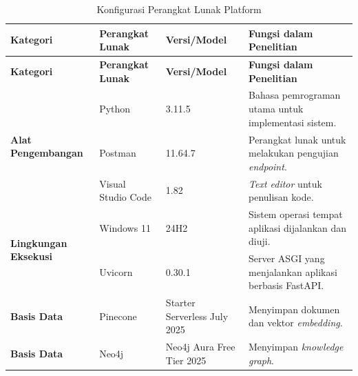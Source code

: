 \begin{longtable}{
	@{}p{2.5cm}
	p{2.5cm}
	p{3cm}
	p{\textwidth - 2.5cm - 2.5cm - 3cm - 6\tabcolsep}@{}}


	\caption{Konfigurasi Perangkat Lunak Platform}
	\label{tab:konfigurasi}                                                                                                                                                                 \\

	\toprule
	\textbf{Kategori}                              & \textbf{Perangkat Lunak} & \textbf{Versi/Model}         & \textbf{Fungsi dalam Penelitian}                                             \\
	\midrule
	\endfirsthead

	\toprule
	\textbf{Kategori}                              & \textbf{Perangkat Lunak} & \textbf{Versi/Model}         & \textbf{Fungsi dalam Penelitian}                                             \\
	\midrule
	\endhead


	\multirow{3}{=}{\textbf{Alat Pengembangan}}    & Python                   & 3.11.5                       & Bahasa pemrograman utama untuk implementasi sistem.                          \\
	                                               & Postman                  & 11.64.7                      & Perangkat lunak untuk melakukan pengujian \textit{endpoint}.                 \\
	                                               & Visual Studio Code       & 1.82                         & \textit{Text editor} untuk penulisan kode.                                   \\ \midrule

	\multirow{2}{=}{\textbf{Lingkungan Eksekusi}}  & Windows 11               & 24H2                         & Sistem operasi tempat aplikasi dijalankan dan diuji.                         \\
	                                               & Uvicorn                  & 0.30.1                       & Server ASGI yang menjalankan aplikasi berbasis FastAPI.                      \\ \midrule

	\textbf{Basis Data}                            & Pinecone                 & Starter Serverless July 2025 & Menyimpan dokumen dan vektor \textit{embedding}.                             \\
	\textbf{Basis Data}                            & Neo4j                    & Neo4j Aura Free Tier 2025    & Menyimpan \textit{knowledge graph}.                                          \\ \midrule


\end{longtable}
